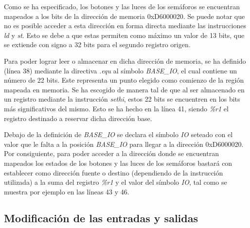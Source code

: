 \documentclass{article}
\begin{document}
	Como se ha especificado, los botones y las luces de los semáforos se encuentran mapeados a los bits de la dirección de memoria 0xD6000020. Se puede notar que no es posible acceder a esta dirección en forma directa mediante las instrucciones \textit{ld} y \textit{st}. Esto se debe a que estas permiten como máximo un valor de 13 bits, que se extiende con signo a 32 bits para el segundo registro origen.
	\par
	Para poder lograr leer o almacenar en dicha dirección de memoria, se ha definido (línea 38) mediante la directiva \textit{.equ} al símbolo \textit{BASE\_IO}, el cual contiene un número de 22 bits. Este representa un punto elegido como comienzo de la región mapeada en memoria. Se ha escogido de manera tal de que al ser almacenado en un registro mediante la instrucción \textit{sethi}, estos 22 bits se encuentren en los bits más significativos del mismo. Esto se ha hecho en la línea 41, siendo \textit{\%r1} el registro destinado a reservar dicha dirección base. 
	\par
	Debajo de la definición de \textit{BASE\_IO} se declara el símbolo \textit{IO}  seteado con el valor que le falta a la posición \textit{BASE\_IO} para llegar a la dirección 0xD6000020. Por consiguiente, para poder acceder a la dirección donde se encuentran mapeados los estados de los botones y las luces de los semáforos bastará con establecer como dirección fuente o destino (dependiendo de la instrucción utilizada) a la suma del registro \textit{\%r1} y el valor del símbolo \textit{IO}, tal como se muestra por ejemplo en las líneas 43 y 46.
	\bigskip\medskip



\subsection{Modificación de las entradas y salidas}
\medskip
\end{document}
